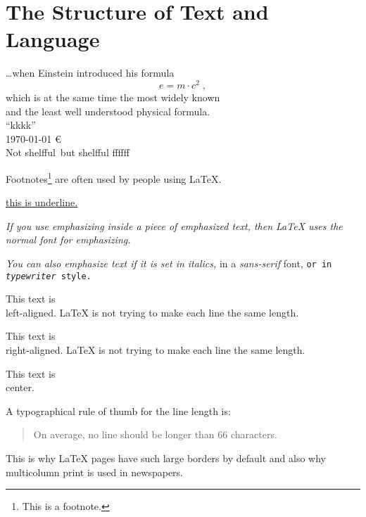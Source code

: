 \documentclass{article}
\begin{document}
%
\section{The Structure of Text and Language}
\ldots when Einstein introduced his formula
\begin{equation}
  e = m \cdot c^2 \; ,
\end{equation}
which is at the same time the most widely known \\
and the least well understood physical formula. \\
``kkkk''\\
\today 
% 
\euro\\
Not shelfful\
but shelf\mbox{}ful
ffffff


%
Footnotes\footnote{This is
  a footnote.} are often used
by people using \LaTeX.

\underline{this is underline.}

\emph{If you use
  emphasizing inside a piece
  of emphasized text, then
  \LaTeX{} uses the
  \emph{normal} font for
  emphasizing.}

\textit{You can also
  \emph{emphasize} text if
  it is set in italics,}
\textsf{in a
  \emph{sans-serif} font,}
\texttt{or in
\emph{typewriter} style.}

\begin{flushleft}
  This text is\\ left-aligned.
  \LaTeX{} is not trying to make
  each line the same length.
\end{flushleft}

\begin{flushright}
  This text is\\ right-aligned.
  \LaTeX{} is not trying to make
  each line the same length.
\end{flushright}

\begin{center}
  This text is\\ center.
\end{center}

A typographical rule of thumb
for the line length is:
\begin{quote}
  On average, no line should
  be longer than 66 characters.
\end{quote}
This is why \LaTeX{} pages have
such large borders by default
and also why multicolumn print
is used in newspapers.
\end{document}

